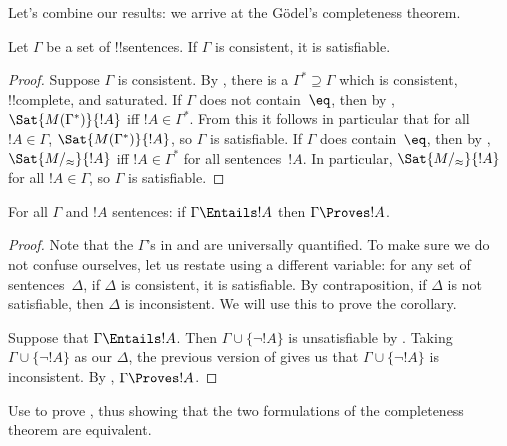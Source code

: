 \documentclass[../../../include/open-logic-section]{subfiles}
\begin{document}

Let's combine our results: we arrive at the G\"odel's completeness theorem.

\begin{thm}
Let $\Gamma$ be a set of !!{sentence}s.  If $\Gamma$ is consistent, it
is satisfiable.
\end{thm}

\begin{proof}
Suppose $\Gamma$ is consistent.  By , there
is a $\Gamma^* \supseteq \Gamma$ which is consistent, !!{complete},
and saturated.  If $\Gamma$ does not contain~$\eq$, then by
, $\Sat{M(\Gamma^*)}{!A}$ iff $!A \in \Gamma^*$.
From this it follows in particular that for all $!A \in \Gamma$,
$\Sat{M(\Gamma^*)}{!A}$, so $\Gamma$ is satisfiable.  If $\Gamma$ does
contain~$\eq$, then by , $\Sat{M/_\approx}{!A}$
iff $!A \in \Gamma^*$ for all sentences~$!A$.  In particular,
$\Sat{M/_\approx}{!A}$ for all $!A \in \Gamma$, so $\Gamma$ is
satisfiable.
\end{proof}

\begin{cor}
For all $\Gamma$ and $!A$ sentences: if $\Gamma \Entails !A$ then
$\Gamma \Proves !A$.
\end{cor}

\begin{proof}
Note that the $\Gamma$'s in  and
 are universally quantified.  To make sure we
do not confuse ourselves, let us restate 
using a different variable: for any set of sentences~$\Delta$, if
$\Delta$ is consistent, it is satisfiable.  By contraposition, if
$\Delta$ is not satisfiable, then $\Delta$ is inconsistent.  We will
use this to prove the corollary.

Suppose that $\Gamma \Entails !A$.  Then $\Gamma \cup \{\lnot !A\}$ is
unsatisfiable by .  Taking $\Gamma
\cup \{\lnot !A\}$ as our $\Delta$, the previous version of
 gives us that $\Gamma \cup \{\lnot !A\}$ is
inconsistent.  By
,
$\Gamma \Proves !A$.
\end{proof}

\begin{prob}
Use  to prove
, thus showing that the two
formulations of the completeness theorem are equivalent.
\end{prob}
\end{document}
